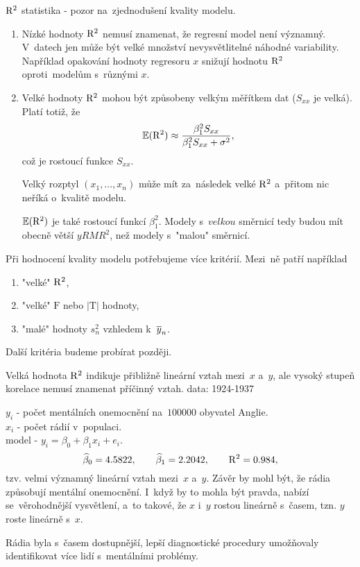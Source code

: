 \begin{remark}
	$\mathrm{R}^2$ statistika - pozor na~zjednodušení kvality modelu. \begin{enumerate}
		\item Nízké hodnoty $\mathrm{R}^2$ nemusí znamenat, že regresní model není významný. V~datech jen může být velké množství nevysvětlitelné náhodné variability. Například opakování hodnoty regresoru $x$ snižují hodnotu $\mathrm{R}^2$ oproti~modelům s~různými $x$.
		\item Velké hodnoty $\mathrm{R}^2$ mohou být způsobeny velkým měřítkem dat ($S_{xx}$ je velká). Platí totiž, že 
		$$ \mathbb{E}(\mathrm{R}^2)\approx\frac{\beta_1^2 S_{xx}}{\beta_1^2 S_{xx}+\sigma^2},$$ což je rostoucí funkce $S_{xx}$.
		
		Velký rozptyl $(x_1,...,x_n)$ může mít za~následek velké $\mathrm{R}^2$ a~přitom nic neříká o~kvalitě modelu.
		
		$\mathbb{E}(\mathrm{R}^2)$ je také rostoucí funkcí $\beta_1^2$. Modely s~$velkou$ směrnicí tedy budou mít obecně větší $yRMR^2$, než modely s~"malou" směrnicí. 
	\end{enumerate}
\end{remark}

Při hodnocení kvality modelu potřebujeme více kritérií. Mezi~ně patří například\begin{enumerate}
	\item "velké" $\mathrm{R}^2$,
	\item "velké" $\mathrm{F}$ nebo $|\mathrm{T}|$ hodnoty,
	\item "malé" hodnoty $s_n^2$ vzhledem k~$\overline{y}_n$.
\end{enumerate}
Další kritéria budeme probírat později.
\begin{example}
	Velká hodnota $\mathrm{R}^2$ indikuje přibližně lineární vztah mezi~$x$ a~$y$, ale vysoký stupeň korelace nemusí znamenat příčinný vztah.
	data: 1924-1937
	
	$y_i$ - počet mentálních onemocnění na~$100000$ obyvatel Anglie.\\
	$x_i$ - počet rádií v~populaci.\\
	model - $y_i=\beta_0+\beta_1 x_i+e_i$.
	$$ \widehat{\beta}_0=4.5822,\qquad\widehat{\beta}_1=2.2042,\qquad\mathrm{R}^2=0.984,$$
	tzv. velmi významný lineární vztah mezi~$x$ a~$y$. Závěr by mohl být, že rádia způsobují mentální onemocnění. I~když by to mohla být pravda, nabízí se~věrohodnější vysvětlení, a~to takové, že $x$ i~$y$ rostou lineárně s~časem, tzn. $y$ roste lineárně s~$x$. 
	
	Rádia byla s~časem dostupnější, lepší diagnostické procedury umožňovaly identifikovat více lidí s~mentálními problémy.
\end{example}